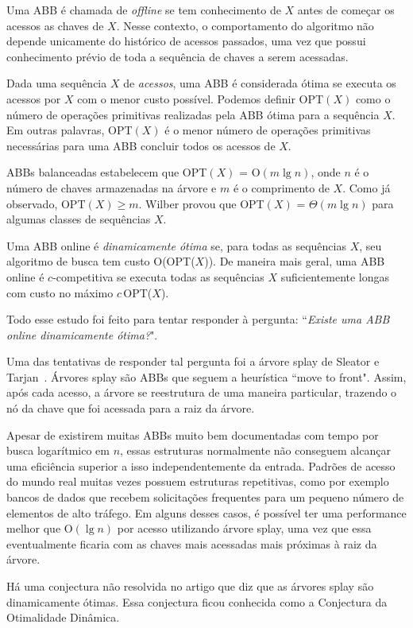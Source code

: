 Uma ABB é chamada de \textit{offline} se tem conhecimento de $X$ antes de começar os acessos as chaves de $X$. Nesse contexto, o comportamento do algoritmo não depende unicamente do histórico de acessos passados, uma vez que possui conhecimento prévio de toda a sequência de chaves a serem acessadas.

Dada uma sequência $X$ de \textit{acessos}, uma ABB é considerada ótima se executa os acessos por $X$ com o menor custo possível. Podemos definir OPT$(X)$ como o número de operações primitivas realizadas pela ABB ótima para a sequência $X$. Em outras palavras, OPT$(X)$ é o menor número de operações primitivas necessárias para uma ABB concluir todos os acessos de $X$. 

ABBs balanceadas estabelecem que OPT$(X)$ = O$(m \lg n)$, onde $n$ é o número de chaves armazenadas na árvore e $m$ é o comprimento de $X$. Como já observado, $\text{OPT}(X) \geq m$. Wilber \cite{lowerbound_wilbert} provou que OPT$(X)$ = $\Theta$$(m \lg n)$ para algumas classes de sequências $X$. 

Uma ABB online é \textit{dinamicamente ótima} se, para todas as sequências $X$, seu algoritmo de busca tem custo O(OPT($X$)). De maneira mais geral, uma ABB online é $c$-competitiva se executa todas as sequências $X$ suficientemente longas com custo no máximo $c$\,OPT($X$).

Todo esse estudo foi feito para tentar responder à pergunta: ``\textit{Existe uma ABB online dinamicamente ótima?}".

Uma das tentativas de responder tal pergunta foi a árvore splay de Sleator e Tarjan~\cite{selfadjustingbst}. Árvores splay são ABBs que seguem a heurística ``move to front". Assim, após cada acesso, a árvore se reestrutura de uma maneira particular, trazendo o nó da chave que foi acessada para a raiz da árvore.

Apesar de existirem muitas ABBs muito bem documentadas com tempo por busca logarítmico em $n$, essas estruturas normalmente não conseguem alcançar uma eficiência superior a isso independentemente da entrada. Padrões de acesso do mundo real muitas vezes possuem estruturas repetitivas, como por exemplo bancos de dados que recebem solicitações frequentes para um pequeno número de elementos de alto tráfego. Em alguns desses casos, é possível ter uma performance melhor que O$(\lg n)$ por acesso utilizando árvore splay, uma vez que essa eventualmente ficaria com as chaves mais acessadas mais próximas à raiz da árvore. 

Há uma conjectura não resolvida no artigo \cite{selfadjustingbst} que diz que as árvores splay são dinamicamente ótimas. Essa conjectura ficou conhecida como a Conjectura da Otimalidade Dinâmica.

